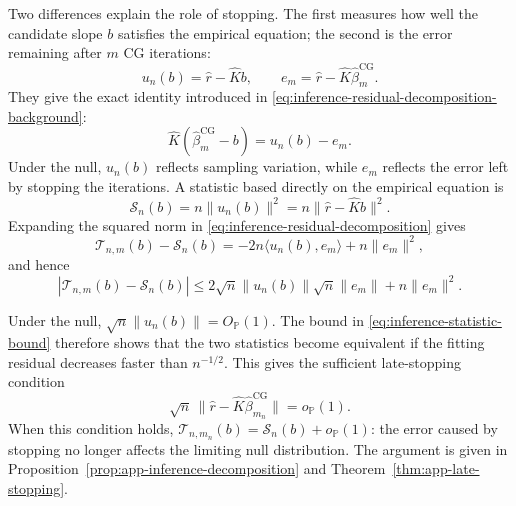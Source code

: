 Two differences explain the role of stopping.  The first measures how well
the candidate slope $b$ satisfies the empirical equation; the second is the
error remaining after $m$ CG iterations:
\begin{equation}
    u_n(b)=\widehat r-\widehat Kb,
    \qquad
    e_m=\widehat r-\widehat K\widehat\beta_m^{\mathrm{CG}}.
    \label{eq:inference-two-residuals}
\end{equation}
They give the exact identity introduced in
\eqref{eq:inference-residual-decomposition-background}:
\begin{equation}
    \widehat K(\widehat\beta_m^{\mathrm{CG}}-b)
    =u_n(b)-e_m.
    \label{eq:inference-residual-decomposition}
\end{equation}
Under the null, $u_n(b)$ reflects sampling variation, while $e_m$ reflects
the error left by stopping the iterations.  A statistic based directly on
the empirical equation is
\begin{equation}
    \mathcal S_n(b)
    =n\|u_n(b)\|^2
    =n\|\widehat r-\widehat Kb\|^2.
    \label{eq:inference-direct-statistic}
\end{equation}
Expanding the squared norm in \eqref{eq:inference-residual-decomposition}
gives
\begin{equation}
    \mathcal T_{n,m}(b)-\mathcal S_n(b)
    =-2n\langle u_n(b),e_m\rangle+n\|e_m\|^2,
    \label{eq:inference-statistic-difference}
\end{equation}
and hence
\begin{equation}
 \left|\mathcal T_{n,m}(b)-\mathcal S_n(b)\right|
 \leq
 2\sqrt n\|u_n(b)\|\sqrt n\|e_m\|
 +n\|e_m\|^2.
 \label{eq:inference-statistic-bound}
\end{equation}

Under the null, $\sqrt n\|u_n(b)\|=O_{\mathbb P}(1)$.  The bound in
\eqref{eq:inference-statistic-bound} therefore shows that the two statistics
become equivalent if the fitting residual decreases faster than $n^{-1/2}$.
This gives the sufficient late-stopping condition
\begin{equation}
    \sqrt n\,
    \|\widehat r-\widehat K\widehat\beta_{m_n}^{\mathrm{CG}}\|
    =o_{\mathbb P}(1).
    \label{eq:inference-late-stopping-condition}
\end{equation}
When this condition holds,
$\mathcal T_{n,m_n}(b)=\mathcal S_n(b)+o_{\mathbb P}(1)$: the error caused by
stopping no longer affects the limiting null distribution.  The argument is
given in Proposition~\ref{prop:app-inference-decomposition} and
Theorem~\ref{thm:app-late-stopping}.

